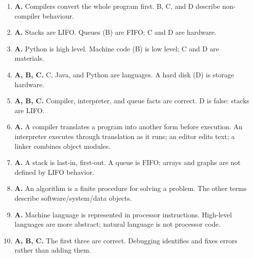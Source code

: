 \begin{enumerate}[label=\textbf{Q\arabic*.}, leftmargin=*]
\item \textbf{A.} Compilers convert the whole program first. B, C, and D describe non-compiler behaviour.
\item \textbf{A.} Stacks are LIFO. Queues (B) are FIFO; C and D are hardware.
\item \textbf{A.} Python is high level. Machine code (B) is low level; C and D are materials.
\item \textbf{A, B, C.} C, Java, and Python are languages. A hard disk (D) is storage hardware.
\item \textbf{A, B, C.} Compiler, interpreter, and queue facts are correct. D is false: stacks are LIFO.
\item \textbf{A.} A compiler translates a program into another form before execution. An interpreter executes through translation as it runs; an editor edits text; a linker combines object modules.

\item \textbf{A.} A stack is last-in, first-out. A queue is FIFO; arrays and graphs are not defined by LIFO behavior.

\item \textbf{A.} An algorithm is a finite procedure for solving a problem. The other terms describe software/system/data objects.

\item \textbf{A.} Machine language is represented in processor instructions. High-level languages are more abstract; natural language is not processor code.

\item \textbf{A, B, C.} The first three are correct. Debugging identifies and fixes errors rather than adding them.

\end{enumerate}
